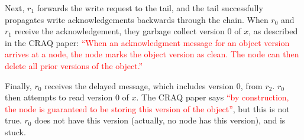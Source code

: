 \documentclass[12pt]{article}
\newcommand{\drawchain}{
  \node[replica] (r0) at (0, 0) {$r_0$};
  \node[replica] (r1) at (1, 0) {$r_1$};
  \node[replica] (r2) at (2, 0) {$r_2$};
}
\newcommand{\oneversion}[3]{
  \begin{tabular}{|l|l|l|}
    \hline
    $#1$ & $#2$ & #3 \\\hline
  \end{tabular}
}
\begin{document}
Next, $r_1$ forwards the write request to the tail, and the tail successfully
propagates write acknowledgements backwards through the chain. When $r_0$ and
$r_1$ receive the acknowledgement, they garbage collect version $0$ of $x$, as
described in the CRAQ paper:
\textcolor{red}{%
``When an acknowledgment message for an object version arrives at a node, the
  node marks the object version as clean. The node can then delete all prior
  versions of the object.''
}
\begin{center}
\end{center}

Finally, $r_0$ receives the delayed message, which includes version $0$, from
$r_2$. $r_0$ then attempts to read version $0$ of $x$. The CRAQ paper says
\textcolor{red}{``by construction, the node is guaranteed to be storing this
version of the object''}, but this is not true. $r_0$ does not have this
version (actually, no node has this version), and is stuck.
\begin{center}
\end{center}
\end{document}
